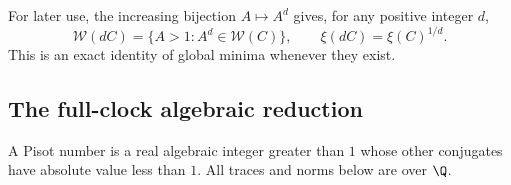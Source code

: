 \documentclass[11pt,a4paper]{article}
\theoremstyle{definition}\newtheorem{definition}[theorem]{Definition}
\theoremstyle{remark}\newtheorem{remark}[theorem]{Remark}
\begin{document}
For later use, the increasing bijection $A\mapsto A^d$ gives, for
any positive integer $d$,
\begin{equation}\label{R07:eq:scaling}
 \mathcal W(dC)=\{A>1:A^d\in\mathcal W(C)\},\qquad
                  \xi(dC)=\xi(C)^{1/d}.
\end{equation}
This is an exact identity of global minima whenever they exist.

\subsection{The full-clock algebraic reduction}\label{R07:sec:bridge}

A Pisot number is a real algebraic integer greater than $1$ whose other
conjugates have absolute value less than $1$.
All traces and norms below are over $\Q$.
\end{document}
